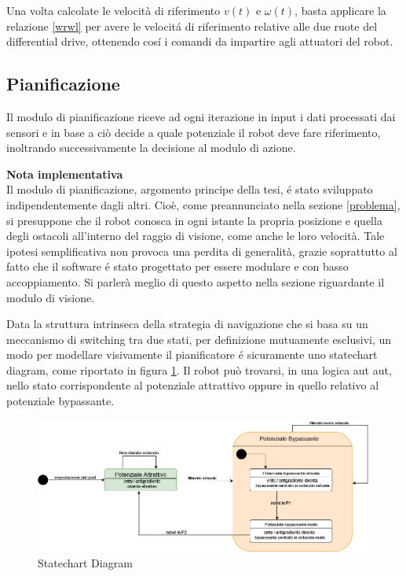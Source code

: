 \documentclass[14pt,a4paper]{extarticle}
\begin{document}
Una volta calcolate le velocità di riferimento \(v(t)\) e \(\omega(t)\), basta applicare la relazione \ref{wrwl} per avere le velocitá di riferimento relative alle due ruote del differential drive, ottenendo cosí i comandi da impartire agli attuatori del robot.


\subsection{Pianificazione}
Il modulo di pianificazione riceve ad ogni iterazione in input i dati processati dai sensori e in base a ciò decide a quale potenziale il robot deve fare riferimento, inoltrando successivamente la decisione al modulo di azione. 
\begin{nota}
\textbf{Nota implementativa} \\ Il modulo di pianificazione, argomento principe della tesi, é stato sviluppato indipendentemente dagli altri. Cioè, come preannunciato nella sezione \ref{problema}, si presuppone che il robot conosca in ogni istante la propria posizione e quella degli ostacoli all'interno del raggio di visione, come anche le loro velocità. Tale ipotesi semplificativa non provoca una perdita di generalità, grazie soprattutto al fatto che il software é stato progettato per essere modulare e con basso accoppiamento. Si parlerà meglio di questo aspetto nella sezione riguardante il modulo di visione.
\end{nota}
Data la struttura intrinseca della strategia di navigazione che si basa su un meccanismo di switching tra due stati, per definizione mutuamente esclusivi, un modo per modellare visivamente il pianificatore é sicuramente uno statechart diagram, come riportato in figura \ref{state}. Il robot può trovarsi, in una logica aut aut, nello stato corrispondente al potenziale attrattivo oppure in quello relativo al potenziale bypassante.

\begin{figure}[H]
\caption{Statechart Diagram} \label{state}
\includegraphics[width=\textwidth]{statechart.png}
\end{figure}
\end{document}
